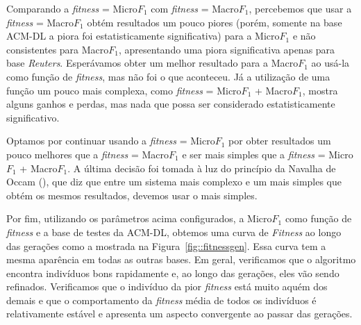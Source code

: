

Comparando a \textit{fitness} = Micro$F_1$ com \textit{fitness} = Macro$F_1$, percebemos que usar a \textit{fitness} = Macro$F_1$ obtém resultados um pouco piores (porém, somente na base \textsc{ACM-DL} a piora foi estatisticamente significativa) para a Micro$F_1$ e não consistentes para Macro$F_1$, apresentando uma piora significativa apenas para base \textit{Reuters}. Esperávamos obter um melhor resultado para a Macro$F_1$ ao usá-la como função de \textit{fitness}, mas não foi o que aconteceu.
Já a utilização de uma função um pouco mais complexa, como \textit{fitness} = Micro$F_1$ + Macro$F_1$, mostra alguns ganhos e perdas, mas nada que possa ser considerado estatisticamente significativo.


Optamos por continuar usando a \textit{fitness} = Micro$F_1$
por obter resultados um pouco melhores que a \textit{fitness} = Macro$F_1$ e
ser mais simples que a \textit{fitness} = Micro$F_1$ + Macro$F_1$. A última decisão foi tomada à luz do princípio da Navalha de Occam (\cite{Blumer87}), que diz que entre um sistema mais complexo e um mais simples que obtém os mesmos resultados, devemos usar o mais simples.


Por fim, utilizando os parâmetros acima configurados, a Micro$F_1$ como função de \textit{fitness} e a base de testes da \textsc{ACM-DL}, obtemos uma curva de \textit{Fitness} ao longo das gerações como a mostrada na Figura~\ref{fig::fitnessgen}. Essa curva tem a mesma aparência em todas as outras bases. Em geral, verificamos que o algoritmo encontra indivíduos bons rapidamente e, ao longo das gerações, eles vão sendo refinados. Verificamos que o indivíduo da pior \textit{fitness} está muito aquém dos demais e que o comportamento da \textit{fitness} média de todos os indivíduos é relativamente estável e apresenta um aspecto convergente ao passar das gerações.

